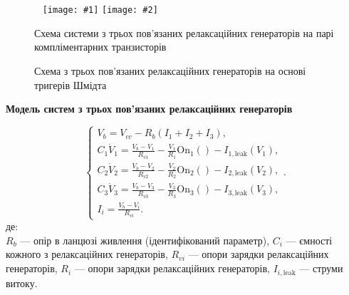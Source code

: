 \documentclass[14pt,handout,utf8]{beamer}
\newlength\DDP
\newcommand{\Xhead}[1]{
 \begin{center}%
      \textbf{#1}%
 \end{center}%
}
\newcommand{\PicDoubleNL}[2]{%
 \begin{center}
    ~ \hfill
    \texttt{[image: \#1]}
    \hfill
    \texttt{[image: \#2]}
    \hfill ~
  \end{center}
}
\begin{document}
\begin{frame}
  \frametitle{~}
  \begin{figure}[htb!]
    \PicDoubleNL{../p7/p/relax3d_board.jpg}{../p7/p/relax3ds_board.jpg}
    \parbox[t]{\DDP} {
      \caption{Схема системи з трьох пов'язаних релаксаційних генераторів на парі компліментарних транзисторів}
      \label{atu:f:relax3d_board}
    }
    \hfill
    \parbox[t]{\DDP} {
      \caption{Схема з трьох пов'язаних релаксаційних генераторів на основі тригерів Шмідта}
      \label{atu:f:relax3ds_board}
    }
  \end{figure}

  \Xhead{Модель систем з трьох пов'язаних релаксаційних генераторів}

  \begin{equation}
  \begin{cases}
    V_b = V_{cc} - R_b ( I_1 + I_2 + I_3 ), \\
      C_1 \dot{V}_1 = \frac{V_b-V_1}{R_{v1}} - \frac{V_1}{R_1} \mathrm{On}_1() - I_{1,\mathrm{leak}}(V_1), \\
      C_2 \dot{V}_2 = \frac{V_b-V_2}{R_{v2}} - \frac{V_2}{R_2} \mathrm{On}_2() - I_{2,\mathrm{leak}}(V_2), \\
      C_3 \dot{V}_3 = \frac{V_b-V_3}{R_{v3}} - \frac{V_3}{R_3} \mathrm{On}_3() - I_{3,\mathrm{leak}}(V_3), \\
      I_i = \frac{V_b-V_i}{R_{vi}}.
  \end{cases}.
    \label{atu:eq:relax3}
\end{equation}
%
де: \\
$R_b $ --- опір в ланцюзі живлення (ідентифікований параметр),
$C_i $ --- ємності кожного з релаксаційних генераторів,
$R_{vi} $ --- опори зарядки релаксаційних генераторів,
$R_{ i} $ --- опори зарядки релаксаційних генераторів,
$I_{i, \mathrm{leak}} $ --- струми витоку.


\end{frame}


\end{document}
